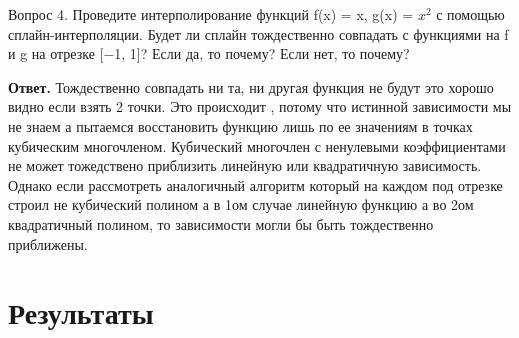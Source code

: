 \documentclass{article}
\begin{document}
	\item Вопрос 4. Проведите интерполирование функций f(x) = x, g(x) = $x^2$
	с помощью сплайн-интерполяции. Будет ли сплайн тождественно совпадать с функциями на f и g на отрезке [−1, 1]? Если да, то почему? Если нет, то почему?
	
	
	{\bfseries Ответ.} 
	Тождественно совпадать ни та, ни другая функция не будут это хорошо видно если взять 2 точки. Это происходит , потому что истинной зависимости мы не знаем а пытаемся восстановить функцию лишь по ее значениям в точках кубическим многочленом. Кубический многочлен с ненулевыми коэффициентами не может тожедствено приблизить линейную или квадратичную зависимость. Однако если рассмотреть аналогичный алгоритм который на каждом под отрезке строил не кубический полином а в 1ом случае линейную функцию а во 2ом квадратичный полином, то зависимости могли бы быть тождественно приближены.
    \section{Результаты}
\end{document}

